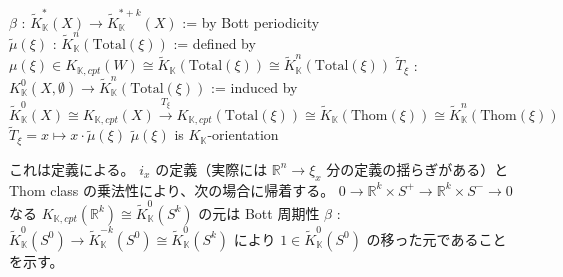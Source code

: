 \documentclass[dvipdfmx]{jsarticle}
\newcommand{\KtheoryReduced}[1]{\tilde{K}_{\mathbb{K}}(#1)}
\newcommand{\Kcohomology}[3]{K_{\mathbb{K}}^{#1}(#2, #3)}
\newcommand{\KcohomologyReduced}[2]{\tilde{K}_{\mathbb{K}}^{#1}(#2)}
\newcommand{\KtheoryCpx}[1]{K_{\mathbb{K},cpt}(#1)}
\newcommand{\KtheoryCpxRel}[2]{K_{\mathbb{K},cpt}(#1, #2)}
\begin{document}
\begin{Theorem}
\itemdefi
  \Let \(\beta\) : \(\KcohomologyReduced{*}{X} \to \KcohomologyReduced{*+k}{X}\) := by Bott periodicity \\
  \Let \(\tilde{\mu}(\xi)\) : \(\KcohomologyReduced{n}{\text{Total}(\xi)}\) := defined by \(\mu(\xi) \in \KtheoryCpx{W} \cong \KtheoryReduced{\text{Total}(\xi)} \cong \KcohomologyReduced{n}{\text{Total}(\xi)}\)
\itemprop
  \Let \(\tilde{T}_{\xi}\) : \(\Kcohomology{0}{X}{\emptyset} \to \KcohomologyReduced{n}{\text{Total}(\xi)}\) := induced by \\
  \(\KcohomologyReduced{0}{X} \cong \KtheoryCpx{X} \overset{T_{\xi}}{\to} \KtheoryCpx{\text{Total}(\xi)} \cong \KtheoryReduced{\text{Thom}(\xi)} \cong \KcohomologyReduced{n}{\text{Thom}(\xi)}\) \\
  \Then \(\tilde{T}_{\xi} = x \mapsto x \cdot \tilde{\mu}(\xi)\)
\itemprop
  \Then \(\tilde{\mu}(\xi)\) is \(K_{\mathbb{K}}\)-orientation
\end{Theorem}

\begin{Proof}
\itemprof
  これは定義による。
\itemprof
  \(i_x\) の定義（実際には \(\mathbb{R}^n \to \xi_x\) 分の定義の揺らぎがある）と Thom class の乗法性により、次の場合に帰着する。
  \(0 \to \mathbb{R}^{k} \times S^{+} \to \mathbb{R}^{k} \times S^{-} \to 0\) なる \(\KtheoryCpx{\mathbb{R}^{k}} \cong \KcohomologyReduced{0}{S^k}\) の元は Bott 周期性 \(\beta\) : \(\KcohomologyReduced{0}{S^0} \to \KcohomologyReduced{-k}{S^0} \cong \KcohomologyReduced{0}{S^k}\) により \(1 \in \KcohomologyReduced{0}{S^0}\) の移った元であることを示す。
\end{Proof}
\end{document}
